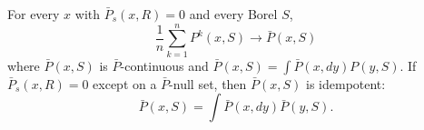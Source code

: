 For every $x$ with $\bar{P}_s(x,R)=0$ and every Borel $S$,
$$\frac{1}{n}\sum_{k=1}^n P^k(x,S)\to\bar{P}(x,S)$$
where $\bar{P}(x,S)$ is $\bar{P}$-continuous and $\bar{P}(x,S)=\int\bar{P}(x,dy)P(y,S)$. If $\bar{P}_s(x,R)=0$ except on a $\bar{P}$-null set, then $\bar{P}(x,S)$ is idempotent:
$$\bar{P}(x,S)=\int\bar{P}(x,dy)\bar{P}(y,S).$$
